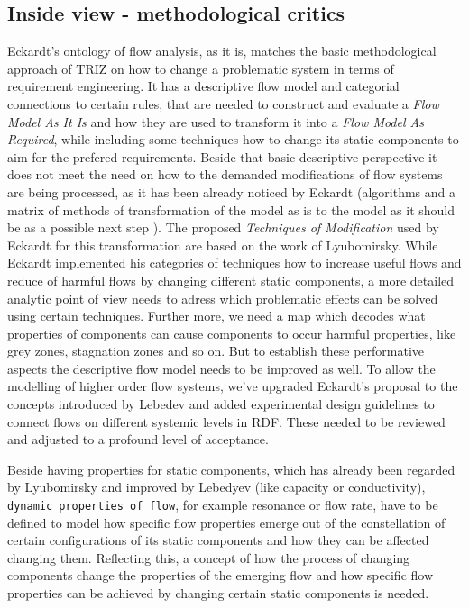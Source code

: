 \documentclass[a4paper,11pt]{article}
\begin{document}
\begin{itemize}
        \subsection{Inside view - methodological critics}
        Eckardt's ontology of flow analysis, as it is, matches the basic 
        methodological approach of TRIZ on how to change a problematic 
        system in terms of requirement engineering. It has a descriptive flow 
        model and categorial connections to certain rules, that are needed to 
        construct and evaluate a \emph{Flow Model As It Is} and how they are 
        used to transform it into a \emph{Flow Model As Required}, while 
        including some techniques how to change its static components to aim 
        for the prefered requirements. Beside that basic descriptive 
        perspective it does not meet the need on how to the demanded 
        modifications of flow systems are being processed, as it has been 
        already noticed by Eckardt (algorithms and a matrix of methods of 
        transformation of the model as is to the model as it should be as a 
        possible next step \cite{Eckardt2020}). The proposed 
        \emph{Techniques of Modification} used by Eckardt for this 
        transformation are based on the work of Lyubomirsky. While Eckardt 
        implemented his categories of techniques how to increase useful flows 
        and reduce of harmful flows by changing different static components, a 
        more detailed analytic point of view needs to adress which problematic 
        effects can be solved using certain techniques. Further more, we need a
        map which decodes what properties of components can cause components to
        occur harmful properties, like grey zones, stagnation zones and so on. 
        But to establish these performative aspects the descriptive flow model 
        needs to be improved as well. To allow the modelling of higher order 
        flow systems, we've upgraded Eckardt's proposal to the concepts 
        introduced by Lebedev \cite{Lebedyev2015} and added experimental design
        guidelines to connect flows on different systemic levels in RDF. These 
        needed to be reviewed and adjusted to a profound level of acceptance.

        Beside having properties for static components, which has already been 
        regarded by Lyubomirsky and improved by Lebedyev (like capacity or 
        conductivity), \texttt{dynamic properties of flow}, for example 
        resonance or flow rate, have to be defined to model how specific flow 
        properties emerge out of the constellation of certain configurations of
        its static components and how they can be affected changing them. 
        Reflecting this, a concept of how the process of changing components 
        change the properties of the emerging flow and how specific flow 
        properties can be achieved by changing certain static components is needed.
        

\end{itemize}
\end{document}
